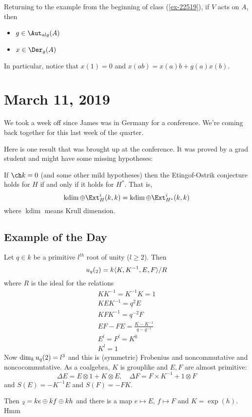 \documentclass[12pt]{article}
\begin{document}
Returning to the example from the beginning of class (\ref{ex-22519}), if $V$ acts on $A$,
then 
\begin{itemize}
	\item $g\in \Aut_{alg}(A)$
	\item $x\in\Der_g(A)$
\end{itemize}
In particular, notice that $x(1)=0$ and $x(ab)=x(a)b+g(a)x(b)$.

\section{March 11, 2019}
We took a week off since James was in Germany for a conference. We're coming back together for this
last week of the quarter.

Here is one result that was brought up at the conference. It was proved by a grad student and might 
have some missing hypotheses:
\begin{thm}
	If $\ch k=0$ (and some other mild hypotheses) then the Etingof-Ostrik conjecture holds for $H$ 
	if and only if it holds for $H^*$. That is,
	\[\operatorname{kdim}\oplus \Ext_H^i(k,k)=\operatorname{kdim}\oplus \Ext^i_{H^*}(k,k)\]
	where $\operatorname{kdim}$ means Krull dimension.
\end{thm}

\subsection{Example of the Day}
\begin{ex}
	Let $q\in k$ be a primitive $l^{th}$ root of unity ($l\ge 2$). Then
	\[u_q(\sl_2)=k\langle K,K^{-1},E,F\rangle/R\]
	where $R$ is the ideal for the relations
	\begin{align*}
		KK^{-1}=K^{-1}K=1\\
		KEK^{-1}=q^2E\\
		KFK^{-1}=q^{-2}F\\
		EF-FE=\frac{K-K^{-1}}{q-q^{-1}}\\
		E^l=F^l=K^0\\
		K^l=1
	\end{align*}
	Now $\dim_k u_q(\sl2)=l^3$ and this is (symmetric) Frobenius and noncommutative and noncocommutative.
	As a coalgebra, $K$ is grouplike and $E,F$ are almost primitive:
	\[\Delta E=E\otimes 1+K\otimes E,\quad \Delta F = F\times K^{-1}+1\otimes F\]
	and $S(E)=-K^{-1}E$ and $S(F)=-FK$.

	Then $\sl_2=ke\oplus kf\oplus kh$ and there is a map $e\mapsto E$, $f\mapsto F$ and $K=\exp(h)$. Hmm
\end{ex}
\end{document}
